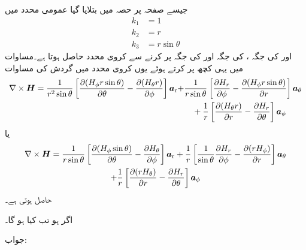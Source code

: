جیسے صفحہ  پر حصہ  میں بتلایا گیا عمومی محدد میں
\begin{align*}
k_1&=1\\
k_2&=r\\
k_3&= r \sin \theta
\end{align*}
اور  کی جگہ ،  کی جگہ  اور  کی جگہ  پر کرنے سے کروی محدد حاصل ہوتا ہے۔مساوات  میں یہی کچھ پر کرتے ہوئے یوں کروی محدد میں گردش کی مساوات
\begin{align*}
\nabla \times {\ensuremath{{\boldsymbol{H}}}}=\frac{1}{r^2 \sin \theta}\left[\frac{\partial (H_\phi r \sin \theta)}{\partial \theta}-\frac{\partial (H_{\theta} r)}{\partial \phi} \right]{\boldsymbol{a}}_{\textup{r}}+&\frac{1}{r \sin \theta}\left[\frac{\partial H_r }{\partial \phi}-\frac{\partial (H_\phi  r \sin \theta)}{\partial r} \right]{\boldsymbol{a}}_{\theta}\\
&\quad +\frac{1}{r}\left[\frac{\partial (H_\theta r)}{\partial r}-\frac{\partial H_r }{\partial \theta} \right]{\boldsymbol{a}}_{\phi}
\end{align*}
یا
\begin{multline}\label{مساوات_مقناطیسی_کروی_گردش}
\nabla \times {\ensuremath{{\boldsymbol{H}}}}=\frac{1}{r \sin \theta}\left[\frac{\partial (H_{\phi}  \sin \theta)}{\partial \theta}-\frac{\partial H_{\theta} }{\partial \phi} \right]{\boldsymbol{a}}_{\textup{r}}+\frac{1}{r }\left[\frac{1}{\sin \theta}\frac{\partial H_r }{\partial \phi}-\frac{\partial (r H_{\phi} )}{\partial r} \right]{\boldsymbol{a}}_{\theta}
\\
 +\frac{1}{r}\left[\frac{\partial (r H_\theta )}{\partial r}-\frac{\partial H_r }{\partial \theta} \right]{\boldsymbol{a}}_{\phi}
\end{multline}
حاصل ہوتی ہے۔

اگر  ہو تب  کیا ہو گا۔

جواب:

